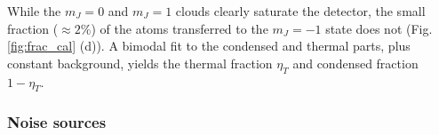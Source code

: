 	While the $m_J=0$ and $m_J=1$ clouds clearly saturate the detector, the small fraction ($\approx2\%$) of the atoms transferred to the $m_J=-1$ state does not (Fig. \ref{fig:frac_cal} (d)). 
	A bimodal fit to the condensed and thermal parts, plus constant background, yields the thermal fraction $\eta_T$ and condensed fraction $1-\eta_T$.

	

	



\subsubsection{Noise sources}
\label{sec:spinpop}

